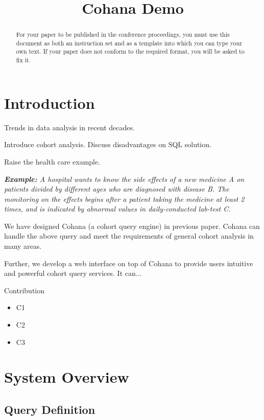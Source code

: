 \documentclass[10pt,conference,letterpaper]{IEEEtran}
\title{Cohana Demo}
\begin{document}
\maketitle
%
\begin{abstract} 
For your paper to be published in the conference proceedings, you must
use this document as both an instruction set and as a template into
which you can type your own text.  If your paper does not conform to
the required format, you will be asked to fix it.
\end{abstract}

%
\section{Introduction}
%
Trends in data analysis in recent decades.

Introduce cohort analysis. Discuss disadvantages on SQL solution.

Raise the health care example.

\emph{\textbf{Example:} A hospital wants to know the side effects of a new medicine A on patients divided by different ages who are diagnosed with disease B. The monitoring on the effects begins after a patient taking the medicine at least 2 times, and is indicated by abnormal values in daily-conducted lab-test C.}

We have designed Cohana (a cohort query engine) in previous paper. Cohana can handle the above query and meet the requirements of general cohort analysis in many areas.

Further, we develop a web interface on top of Cohana to provide users intuitive and powerful cohort query services. It can...

Contribution
\begin{itemize}
\item	C1
\item   C2
\item   C3
\end{itemize}

\section{System Overview}

\subsection{Query Definition}
\end{document}
